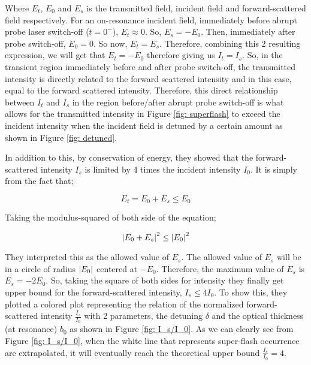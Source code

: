 Where $E_{t}$, $E_{0}$ and $E_{s}$ is the transmitted field, incident field and forward-scattered field respectively. For an on-resonance incident field, immediately before abrupt probe laser switch-off ($t = 0^{-}$), $E_{t} \approx 0$. So, $E_{s} = - E_{0}$. Then, immediately after probe switch-off, $E_{0} = 0$. So now, $E_{t} = E_{s}$. Therefore, combining this 2 resulting expression, we will get that $E_{t} = - E_{0}$ therefore giving us $I_{t} = I_{s}$. So, in the transient region immediately before and after probe switch-off, the transmitted intensity is directly related to the forward scattered intensity and in this case, equal to the forward scattered intensity. Therefore, this direct relationship between $I_{t}$ and $I_{s}$ in the region before/after abrupt probe switch-off is what allows for the transmitted intensity in Figure \ref{fig: superflash} to exceed the incident intensity when the incident field is detuned by a certain amount as shown in Figure \ref{fig: detuned}.

In addition to this, by conservation of energy, they showed that the forward-scattered intensity $I_{s}$ is limited by 4 times the incident intensity $I_{0}$. It is simply from the fact that;

\begin{equation}
    E_{t} = E_{0} + E_{s} \leq E_{0}
\end{equation}

\newpage

Taking the modulus-squared of both side of the equation;

\begin{equation}
    \abs{E_{0} + E_{s}}^{2} \leq \abs{E_{0}}^{2}
\end{equation}

They interpreted this as the allowed value of $E_{s}$. The allowed value of $E_{s}$ will be in a circle of radius $\abs{E_{0}}$ centered at $-E_{0}$. Therefore, the maximum value of $E_{s}$ is $E_{s} = -2 E_{0}$. So, taking the square of both sides for intensity they finally get upper bound for the forward-scattered intensity, $I_{s} \leq 4 I_{0}$. To show this, they plotted a colored plot representing the relation of the normalized forward-scattered intensity $\frac{I_{s}}{I_{0}}$ with 2 parameters, the detuning $\delta$ and the optical thickness (at resonance) $b_{0}$ as shown in Figure \ref{fig: I_s/I_0}. As we can clearly see from Figure \ref{fig: I_s/I_0}, when the white line that represents super-flash occurrence are extrapolated, it will eventually reach the theoretical upper bound $\frac{I_{s}}{I_{0}} = 4$.

